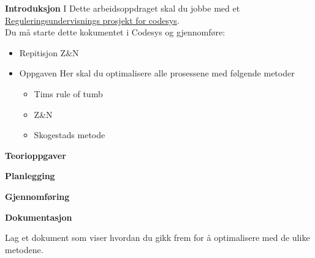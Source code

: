 

\noindent

\vskip 5pt


\textbf{Introduksjon}
I Dette arbeidsoppdraget  skal du jobbe med et \href{https://rfka-my.sharepoint.com/:u:/g/personal/fred-olav_mosdal_skole_rogfk_no/EdYP_MBtF1hIv2zqvzwtseMBLPwboQBdzCetAxSY83kwLw?e=PAZiw7}{Reguleringsundervisnings prosjekt for codesys}. \\

Du må starte dette kokumentet i Codesys og gjennomføre:
\begin{itemize}[noitemsep]
\item Repitisjon Z\&N
\item Oppgaven Her skal du optimalisere alle prosessene med følgende metoder
\begin{itemize}[noitemsep]
\item Tims rule of tumb
\item Z\&N
\item Skogestads metode
\end{itemize}


\end{itemize}



\textbf{Teorioppgaver}

\textbf{Planlegging}

\textbf{Gjennomføring}

\textbf{Dokumentasjon}

Lag et dokument som viser hvordan du gikk frem for å optimalisere med de ulike metodene. 















\vfil \eject

















